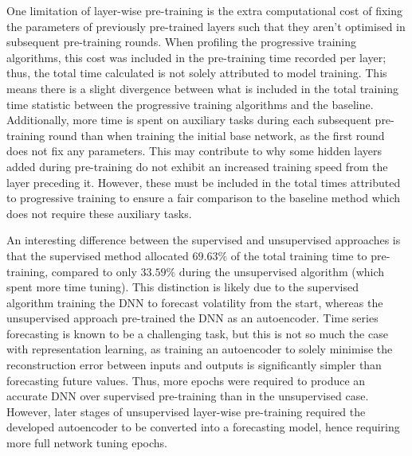 \documentclass[a4paper, 11pt]{report}
\begin{document}
    One limitation of layer-wise pre-training is the extra computational cost of fixing the parameters of previously pre-trained layers such that they aren't optimised in subsequent pre-training rounds. When profiling the progressive training algorithms, this cost was included in the pre-training time recorded per layer; thus, the total time calculated is not solely attributed to model training. This means there is a slight divergence between what is included in the total training time statistic between the progressive training algorithms and the baseline. Additionally, more time is spent on auxiliary tasks during each subsequent pre-training round than when training the initial base network, as the first round does not fix any parameters. This may contribute to why some hidden layers added during pre-training do not exhibit an increased training speed from the layer preceding it. However, these must be included in the total times attributed to progressive training to ensure a fair comparison to the baseline method which does not require these auxiliary tasks.

    An interesting difference between the supervised and unsupervised approaches is that the supervised method allocated $69.63\%$ of the total training time to pre-training, compared to only $33.59\%$ during the unsupervised algorithm (which spent more time tuning). This distinction is likely due to the supervised algorithm training the DNN to forecast volatility from the start, whereas the unsupervised approach pre-trained the DNN as an autoencoder. Time series forecasting is known to be a challenging task, but this is not so much the case with representation learning, as training an autoencoder to solely minimise the reconstruction error between inputs and outputs is significantly simpler than forecasting future values. Thus, more epochs were required to produce an accurate DNN over supervised pre-training than in the unsupervised case. However, later stages of unsupervised layer-wise pre-training required the developed autoencoder to be converted into a forecasting model, hence requiring more full network tuning epochs.
\end{document}
